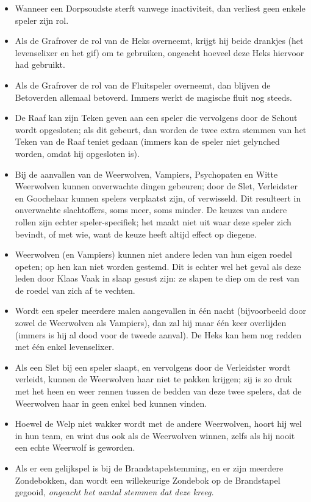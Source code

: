 \documentclass[12pt]{article}
\begin{document}
\begin{itemize}
  	\item Wanneer een Dorpsoudste sterft vanwege inactiviteit, dan verliest geen enkele speler zijn rol.
  	\item Als de Grafrover de rol van de Heks overneemt, krijgt hij beide drankjes (het levenselixer en het gif) om te gebruiken, ongeacht hoeveel deze Heks hiervoor had gebruikt.
  	\item Als de Grafrover de rol van de Fluitspeler overneemt, dan blijven de Betoverden allemaal betoverd. Immers werkt de magische fluit nog steeds.
  	\item De Raaf kan zijn Teken geven aan een speler die vervolgens door de Schout wordt opgesloten; als dit gebeurt, dan worden de twee extra stemmen van het Teken van de Raaf teniet gedaan (immers kan de speler niet gelynched worden, omdat hij opgesloten is).
  	\item Bij de aanvallen van de Weerwolven, Vampiers, Psychopaten en Witte Weerwolven kunnen onverwachte dingen gebeuren; door de Slet, Verleidster en Goochelaar kunnen spelers verplaatst zijn, of verwisseld. Dit resulteert in onverwachte slachtoffers, soms meer, soms minder. De keuzes van andere rollen zijn echter speler-specifiek; het maakt niet uit waar deze speler zich bevindt, of met wie, want de keuze heeft altijd effect op diegene.
	\item Weerwolven (en Vampiers) kunnen niet andere leden van hun eigen roedel opeten; op hen kan niet worden gestemd. Dit is echter wel het geval als deze leden door Klaas Vaak in slaap gesust zijn: ze slapen te diep om de rest van de roedel van zich af te vechten.
  	\item Wordt een speler meerdere malen aangevallen in \'e\'en nacht (bijvoorbeeld door zowel de Weerwolven als Vampiers), dan zal hij maar \'e\'en keer overlijden (immers is hij al dood voor de tweede aanval). De Heks kan hem nog redden met \'e\'en enkel levenselixer.
  	\item Als een Slet bij een speler slaapt, en vervolgens door de Verleidster wordt verleidt, kunnen de Weerwolven haar niet te pakken krijgen; zij is zo druk met het heen en weer rennen tussen de bedden van deze twee spelers, dat de Weerwolven haar in geen enkel bed kunnen vinden.
  	\item Hoewel de Welp niet wakker wordt met de andere Weerwolven, hoort hij wel in hun team, en wint dus ook als de Weerwolven winnen, zelfs als hij nooit een echte Weerwolf is geworden.
  	\item Als er een gelijkspel is bij de Brandstapelstemming, en er zijn meerdere Zondebokken, dan wordt een willekeurige Zondebok op de Brandstapel gegooid, \emph{ongeacht het aantal stemmen dat deze kreeg.}
    \end{itemize}
\end{document}
